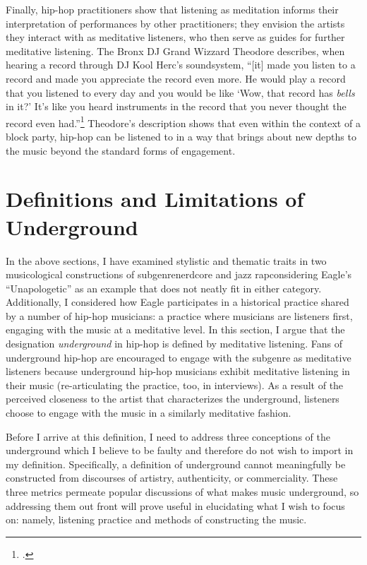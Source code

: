 Finally, hip-hop practitioners show that listening as meditation informs their interpretation of performances 
by other practitioners; they envision the artists they interact with as meditative listeners, who then serve
as guides for further meditative listening. The Bronx DJ Grand Wizzard Theodore describes, when hearing a 
record through DJ Kool Herc's soundsystem, ``[it] made you listen to a record and made you appreciate the 
record even more. He would play a record that you listened to every day and you would be like `Wow, that 
record has \emph{bells} in it?' It's like you heard instruments in the record that you never thought the 
record even had.''\footnote{
    \autocite[139]{christabronGlassHiphopProduction2015}.} 
Theodore's description shows that even within the context of a block party, hip-hop can be listened to
in a way that brings about new depths to the music beyond the standard forms of engagement.

\section{Definitions and Limitations of Underground} \label{undergrounddeflims}

In the above sections, I have examined stylistic and thematic traits in two musicological 
constructions  of subgenre\textemdash nerdcore and jazz rap\textemdash considering Eagle's
``Unapologetic'' as an example that does not neatly fit in either category. Additionally, I
considered how Eagle participates in a historical practice shared by a number of hip-hop 
musicians: a practice where musicians are listeners first, engaging with the music at a meditative
level. In this section, I argue that the designation \emph{underground} in hip-hop is defined 
by meditative listening. Fans of underground hip-hop are encouraged to engage with the subgenre 
as meditative listeners because underground hip-hop musicians exhibit meditative listening in
their music (re-articulating the practice, too, in interviews). As a result of the perceived 
closeness to the artist that characterizes the underground, listeners choose to engage with
the music in a similarly meditative fashion.

Before I arrive at this definition, I need to address three conceptions of the underground 
which I believe to be faulty and therefore do not wish to import in my definition. Specifically,
a definition of underground cannot meaningfully be constructed from discourses of artistry, 
authenticity, or commerciality. These three metrics permeate popular discussions of what 
makes music underground, so addressing them out front will prove useful in elucidating what
I wish to focus on: namely, listening practice and methods of constructing the music.

